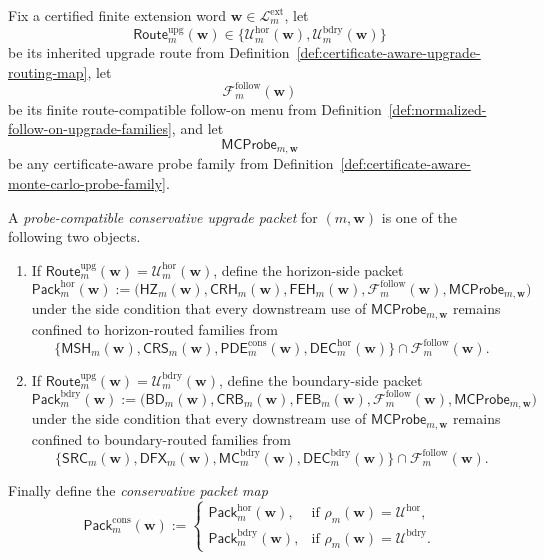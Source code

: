 \begin{definition}
\label{def:probe-compatible-conservative-upgrade-packet}
Fix a certified finite extension word \(\mathbf w\in\mathcal L^{\mathrm{ext}}_{m}\), let
\[
 \mathsf{Route}^{\mathrm{upg}}_{m}(\mathbf w)
 \in
 \{\mathcal U^{\mathrm{hor}}_{m}(\mathbf w),\mathcal U^{\mathrm{bdry}}_{m}(\mathbf w)\}
\]
be its inherited upgrade route from Definition~\ref{def:certificate-aware-upgrade-routing-map}, let
\[
 \mathcal F^{\mathrm{follow}}_{m}(\mathbf w)
\]
be its finite route-compatible follow-on menu from Definition~\ref{def:normalized-follow-on-upgrade-families}, and let
\[
 \mathsf{MCProbe}_{m,\mathbf w}
\]
be any certificate-aware probe family from Definition~\ref{def:certificate-aware-monte-carlo-probe-family}.

A \emph{probe-compatible conservative upgrade packet} for \((m,\mathbf w)\) is one of the following two objects.
\begin{enumerate}[label=(\roman*)]
 \item If \(\mathsf{Route}^{\mathrm{upg}}_{m}(\mathbf w)=\mathcal U^{\mathrm{hor}}_{m}(\mathbf w)\), define the horizon-side packet
 \[
 \mathsf{Pack}^{\mathrm{hor}}_{m}(\mathbf w)
 :=
 \bigl(\mathsf{HZ}_{m}(\mathbf w),\mathsf{CRH}_{m}(\mathbf w),\mathsf{FEH}_{m}(\mathbf w),\mathcal F^{\mathrm{follow}}_{m}(\mathbf w),\mathsf{MCProbe}_{m,\mathbf w}\bigr)
 \]
 under the side condition that every downstream use of \(\mathsf{MCProbe}_{m,\mathbf w}\) remains confined to horizon-routed families from
 \[
 \{\mathsf{MSH}_{m}(\mathbf w),\mathsf{CRS}_{m}(\mathbf w),\mathsf{PDE}^{\mathrm{cons}}_{m}(\mathbf w),\mathsf{DEC}^{\mathrm{hor}}_{m}(\mathbf w)\}\cap \mathcal F^{\mathrm{follow}}_{m}(\mathbf w).
 \]
 \item If \(\mathsf{Route}^{\mathrm{upg}}_{m}(\mathbf w)=\mathcal U^{\mathrm{bdry}}_{m}(\mathbf w)\), define the boundary-side packet
 \[
 \mathsf{Pack}^{\mathrm{bdry}}_{m}(\mathbf w)
 :=
 \bigl(\mathsf{BD}_{m}(\mathbf w),\mathsf{CRB}_{m}(\mathbf w),\mathsf{FEB}_{m}(\mathbf w),\mathcal F^{\mathrm{follow}}_{m}(\mathbf w),\mathsf{MCProbe}_{m,\mathbf w}\bigr)
 \]
 under the side condition that every downstream use of \(\mathsf{MCProbe}_{m,\mathbf w}\) remains confined to boundary-routed families from
 \[
 \{\mathsf{SRC}_{m}(\mathbf w),\mathsf{DFX}_{m}(\mathbf w),\mathsf{MC}^{\mathrm{bdry}}_{m}(\mathbf w),\mathsf{DEC}^{\mathrm{bdry}}_{m}(\mathbf w)\}\cap \mathcal F^{\mathrm{follow}}_{m}(\mathbf w).
 \]
\end{enumerate}
Finally define the \emph{conservative packet map}
\[
 \mathsf{Pack}^{\mathrm{cons}}_{m}(\mathbf w)
 :=
 \begin{cases}
 \mathsf{Pack}^{\mathrm{hor}}_{m}(\mathbf w), & \text{if }\rho_m(\mathbf w)=\mathcal U^{\mathrm{hor}},\\[2mm]
 \mathsf{Pack}^{\mathrm{bdry}}_{m}(\mathbf w), & \text{if }\rho_m(\mathbf w)=\mathcal U^{\mathrm{bdry}}.
 \end{cases}
\]
\end{definition}

